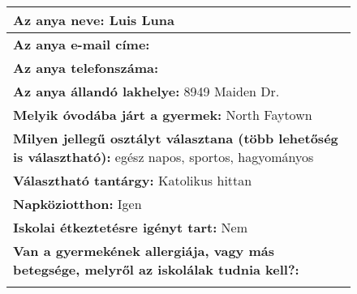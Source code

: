 \documentclass[10pt,a4paper]{article}
\begin{document}
\begin{figure}[!ht]
\begin{tabular}{|m{\textwidth}|}
\hline\vspace{3pt}
\textbf{Az anya neve:} \hspace{0.5cm} Luis Luna \vspace{3pt} \\
\hline\vspace{3pt}
\textbf{Az anya e-mail címe:} \hspace{0.5cm}   \vspace{3pt} \\
\hline\vspace{3pt}
\textbf{Az anya telefonszáma:} \hspace{0.5cm}  \vspace{3pt} \\
\hline\vspace{3pt}
\textbf{Az anya állandó lakhelye:} \hspace{0.5cm} 8949 Maiden Dr. \vspace{3pt} \\
\hline\vspace{3pt}
\textbf{Melyik óvodába járt a gyermek:} \hspace{0.5cm} North Faytown \vspace{3pt} \\
\hline\vspace{3pt}
\textbf{Milyen jellegű osztályt választana (több lehetőség is választható):} \hspace{0.5cm} egész napos, sportos, hagyományos \vspace{3pt} \\
\hline\vspace{3pt}
\textbf{Választható tantárgy:} \hspace{0.5cm} Katolikus hittan \vspace{3pt} \\
\hline\vspace{3pt}
\textbf{Napköziotthon:} \hspace{0.5cm} Igen \vspace{3pt} \\
\hline\vspace{3pt}
\textbf{Iskolai étkeztetésre igényt tart:} \hspace{0.5cm} Nem \vspace{3pt} \\
\hline\vspace{3pt}
\textbf{Van a gyermekének allergiája, vagy más betegsége, melyről az iskolálak tudnia kell?:} \\ \hspace{0.5cm}  \vspace{3pt} \\

\end{tabular}
\end{figure}
\end{document}
